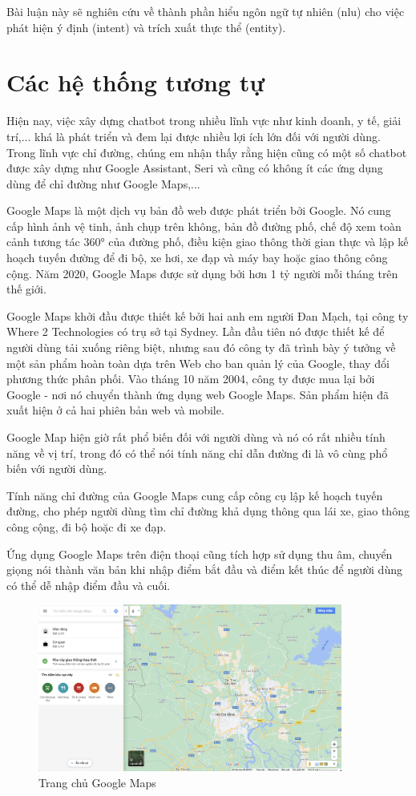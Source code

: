 Bài luận này sẽ nghiên cứu về thành phần hiểu ngôn ngữ tự nhiên (\ac{nlu}) cho việc phát hiện ý định (intent) và trích xuất thực thể (entity).

\section{Các hệ thống tương tự}

Hiện nay, việc xây dựng chatbot trong nhiều lĩnh vực như kinh doanh, y tế, giải trí,... khá là phát triển và đem lại được nhiều lợi ích lớn đối với người dùng. Trong lĩnh vực chỉ đường, chúng em nhận thấy rằng hiện cũng có một số chatbot được xây dựng như Google Assistant, Seri và cũng có không ít các ứng dụng dùng để chỉ đường như Google Maps\cite{ggmaps},...

Google Maps là một dịch vụ bản đồ web được phát triển bởi Google. Nó cung cấp hình ảnh vệ tinh, ảnh chụp trên không, bản đồ đường phố, chế độ xem toàn cảnh tương tác 360° của đường phố, điều kiện giao thông thời gian thực và lập kế hoạch tuyến đường để đi bộ, xe hơi, xe đạp và máy bay hoặc giao thông công cộng. Năm 2020, Google Maps được sử dụng bởi hơn 1 tỷ người mỗi tháng trên thế giới\cite{wiki-ggmaps}.

Google Maps khởi đầu được thiết kế bởi hai anh em người Đan Mạch, tại công ty Where 2 Technologies có trụ sở tại Sydney. Lần đầu tiên nó được thiết kế để người dùng tải xuống riêng biệt, nhưng sau đó công ty đã trình bày ý tưởng về một sản phẩm hoàn toàn dựa trên Web cho ban quản lý của Google, thay đổi phương thức phân phối. Vào tháng 10 năm 2004, công ty được mua lại bởi Google - nơi nó chuyển thành ứng dụng web Google Maps. Sản phẩm hiện đã xuất hiện ở cả hai phiên bản web và mobile.

Google Map hiện giờ rất phổ biến đối với người dùng và nó có rất nhiều tính năng về vị trí, trong đó có thể nói tính năng chỉ dẫn đường đi là vô cùng phổ biến với người dùng.

Tính năng chỉ đường của Google Maps cung cấp công cụ lập kế hoạch tuyến đường, cho phép người dùng tìm chỉ đường khả dụng thông qua lái xe, giao thông công cộng, đi bộ hoặc đi xe đạp.

Ứng dụng Google Maps trên điện thoại cũng tích hợp sử dụng thu âm, chuyển giọng nói thành văn bản khi nhập điểm bắt đầu và điểm kết thúc để người dùng có thể dễ nhập điểm đầu và cuối.

\begin{figure}[H]
    \centering
    \includegraphics[width=10cm]{images/HomePage-GoogleMaps.png}
    \caption{Trang chủ Google Maps}
    \label{fig:homepage-ggmaps}
\end{figure}

